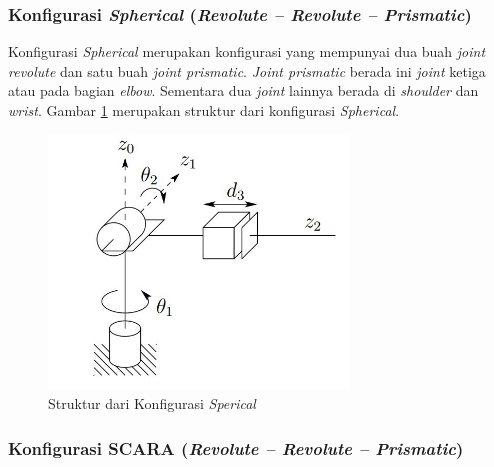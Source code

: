 \subsubsection{Konfigurasi \textit{Spherical} (\textit{Revolute – Revolute – Prismatic})} 

Konfigurasi \textit{Spherical} merupakan konfigurasi yang mempunyai dua buah \textit{joint revolute} dan satu buah \textit{joint prismatic}. \textit{Joint prismatic} berada ini \textit{joint} ketiga atau pada bagian \textit{elbow}. Sementara dua \textit{joint} lainnya berada di \textit{shoulder} dan \textit{wrist}. Gambar \ref{pic.spherical} merupakan struktur dari konfigurasi \textit{Spherical}.
	\begin{figure}[H]
	\centering
	\includegraphics[width=8cm]{gambar/spherical.jpg}
	\caption{Struktur dari Konfigurasi \textit{Sperical}}
	\label{pic.spherical}
\end{figure}


\subsubsection{Konfigurasi SCARA (\textit{Revolute – Revolute – Prismatic}) } 

